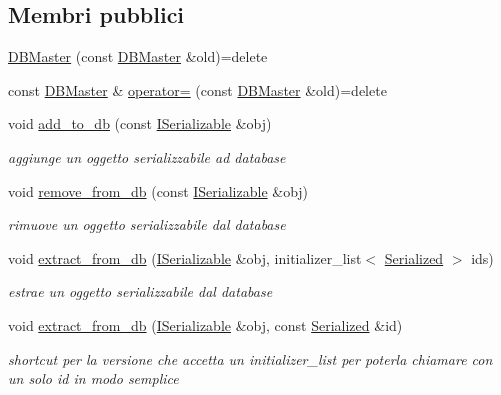 \subsection*{Membri pubblici}
\begin{DoxyCompactItemize}
\item 
\mbox{\hyperlink{classmm_1_1_d_b_master_a7571cbb3fe77a491d57595ec9bc86abf}{D\+B\+Master}} (const \mbox{\hyperlink{classmm_1_1_d_b_master}{D\+B\+Master}} \&old)=delete
\item 
const \mbox{\hyperlink{classmm_1_1_d_b_master}{D\+B\+Master}} \& \mbox{\hyperlink{classmm_1_1_d_b_master_af556b0856b79cb8bff3da0565badeac0}{operator=}} (const \mbox{\hyperlink{classmm_1_1_d_b_master}{D\+B\+Master}} \&old)=delete
\item 
void \mbox{\hyperlink{classmm_1_1_d_b_master_a187988c8741d0a2c5806919b8d672af0}{add\+\_\+to\+\_\+db}} (const \mbox{\hyperlink{classmm_1_1_i_serializable}{I\+Serializable}} \&obj)
\begin{DoxyCompactList}\small\item\em aggiunge un oggetto serializzabile ad database \end{DoxyCompactList}\item 
void \mbox{\hyperlink{classmm_1_1_d_b_master_a4d5d51bf4b3437294a52fcd3747520d3}{remove\+\_\+from\+\_\+db}} (const \mbox{\hyperlink{classmm_1_1_i_serializable}{I\+Serializable}} \&obj)
\begin{DoxyCompactList}\small\item\em rimuove un oggetto serializzabile dal database \end{DoxyCompactList}\item 
void \mbox{\hyperlink{classmm_1_1_d_b_master_a9e8092b67a249a273668ad042a4084e2}{extract\+\_\+from\+\_\+db}} (\mbox{\hyperlink{classmm_1_1_i_serializable}{I\+Serializable}} \&obj, initializer\+\_\+list$<$ \mbox{\hyperlink{structmm_1_1_serialized}{Serialized}} $>$ ids)
\begin{DoxyCompactList}\small\item\em estrae un oggetto serializzabile dal database \end{DoxyCompactList}\item 
void \mbox{\hyperlink{classmm_1_1_d_b_master_a68c25d223994752e8b4d6156a23651f2}{extract\+\_\+from\+\_\+db}} (\mbox{\hyperlink{classmm_1_1_i_serializable}{I\+Serializable}} \&obj, const \mbox{\hyperlink{structmm_1_1_serialized}{Serialized}} \&id)
\begin{DoxyCompactList}\small\item\em shortcut per la versione che accetta un initializer\+\_\+list per poterla chiamare con un solo id in modo semplice \end{DoxyCompactList}\item 

\end{DoxyCompactItemize}
